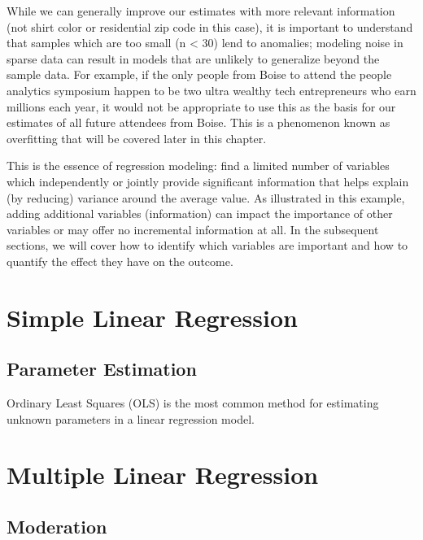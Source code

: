\documentclass[]{book}
\begin{document}
While we can generally improve our estimates with more relevant information (not shirt color or residential zip code in this case), it is important to understand that samples which are too small (n \textless{} 30) lend to anomalies; modeling noise in sparse data can result in models that are unlikely to generalize beyond the sample data. For example, if the only people from Boise to attend the people analytics symposium happen to be two ultra wealthy tech entrepreneurs who earn millions each year, it would not be appropriate to use this as the basis for our estimates of all future attendees from Boise. This is a phenomenon known as overfitting that will be covered later in this chapter.

This is the essence of regression modeling: find a limited number of variables which independently or jointly provide significant information that helps explain (by reducing) variance around the average value. As illustrated in this example, adding additional variables (information) can impact the importance of other variables or may offer no incremental information at all. In the subsequent sections, we will cover how to identify which variables are important and how to quantify the effect they have on the outcome.

\hypertarget{simple-linear-regression}{%
\section{Simple Linear Regression}\label{simple-linear-regression}}

\hypertarget{parameter-estimation}{%
\subsection{Parameter Estimation}\label{parameter-estimation}}

Ordinary Least Squares (OLS) is the most common method for estimating unknown parameters in a linear regression model.

\hypertarget{multiple-linear-regression}{%
\section{Multiple Linear Regression}\label{multiple-linear-regression}}

\hypertarget{moderation}{%
\subsection{Moderation}\label{moderation}}
\end{document}
